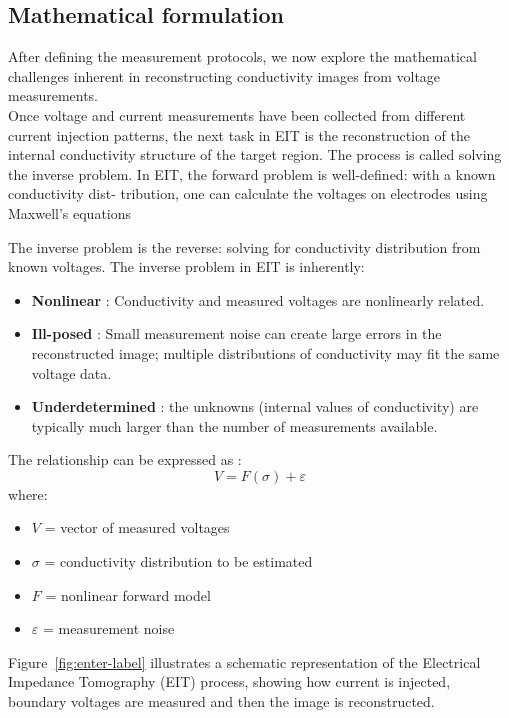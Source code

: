 \subsection{Mathematical formulation}
After defining the measurement protocols, we now explore the mathematical challenges inherent in reconstructing conductivity images from voltage measurements.\\
Once voltage and current measurements have been collected from different current injection patterns, the next task in EIT is the reconstruction of the internal conductivity structure of the target region. The process is called solving the inverse problem.
In EIT, the forward problem is well-defined: with a known conductivity dist-
tribution, one can calculate the voltages on electrodes using Maxwell's equations

The inverse problem is the reverse: solving for conductivity distribution from known voltages.
The inverse problem in EIT is inherently:
\begin{itemize}
    \item \textbf{Nonlinear} : Conductivity and measured voltages are nonlinearly related.
    \item \textbf{Ill-posed} : Small measurement noise can create large errors in the reconstructed
image; multiple distributions of conductivity may fit the same voltage data.
    \item \textbf{Underdetermined} :  the unknowns (internal values of conductivity) are typically much larger than the number of measurements available.
\end{itemize}

The relationship can be expressed as \cite{Seo2019}:
\begin{equation}
V = F(\sigma) + \varepsilon
\label{eq:forward_model}
\end{equation}
where:
\begin{itemize}
    \item $V$ = vector of measured voltages
    \item $\sigma$ = conductivity distribution to be estimated
    \item $F$ = nonlinear forward model
    \item $\varepsilon$ = measurement noise
\end{itemize}
Figure~\ref{fig:enter-label} illustrates a schematic representation of the Electrical Impedance Tomography (EIT) process, showing how current is injected, boundary voltages are measured and then the image is reconstructed.


